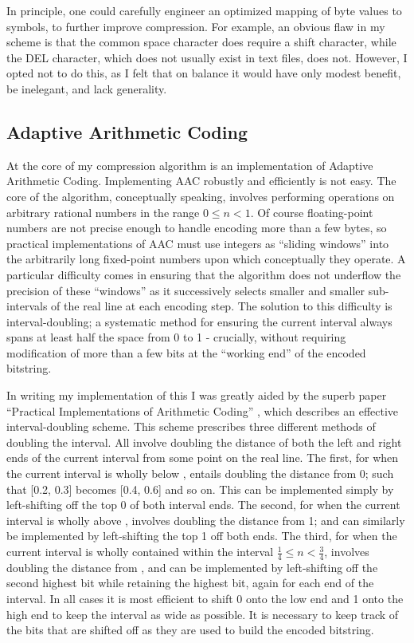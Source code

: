 \documentclass[11pt]{article}
\begin{document}
In principle, one could carefully engineer an optimized mapping of byte values to symbols, to further improve compression. For example, an obvious flaw in my scheme is that the common space character does require a shift character, while the DEL character, which does not usually exist in text files, does not. However, I opted not to do this, as I felt that on balance it would have only modest benefit, be inelegant, and lack generality.


\subsection{Adaptive Arithmetic Coding}

At the core of my compression algorithm is an implementation of Adaptive Arithmetic Coding. Implementing AAC robustly and efficiently is not easy. The core of the algorithm, conceptually speaking, involves performing operations on arbitrary rational numbers in the range $0 \leq n < 1$. Of course floating-point numbers are not precise enough to handle encoding more than a few bytes, so practical implementations of AAC must use integers as \enquote{sliding windows} into the arbitrarily long fixed-point numbers upon which conceptually they operate. A particular difficulty comes in ensuring that the algorithm does not underflow the precision of these \enquote{windows} as it successively selects smaller and smaller sub-intervals of the real line at each encoding step. The solution to this difficulty is interval-doubling; a systematic method for ensuring the current interval always spans at least half the space from 0 to 1 - crucially, without requiring modification of more than a few bits at the \enquote{working end} of the encoded bitstring.

In writing my implementation of this I was greatly aided by the superb paper \enquote{Practical Implementations of Arithmetic Coding} \cite{howard1992practical}, which describes an effective interval-doubling scheme. This scheme prescribes three different methods of doubling the interval. All involve doubling the distance of both the left and right ends of the current interval from some point on the real line. The first, for when the current interval is wholly below , entails doubling the distance from 0; such that [0.2, 0.3] becomes [0.4, 0.6] and so on. This can be implemented simply by left-shifting off the top 0 of both interval ends. The second, for when the current interval is wholly above , involves doubling the distance from 1; and can similarly be implemented by left-shifting the top 1 off both ends. The third, for when the current interval is wholly contained within the interval $\frac{1}{4} \leq n < \frac{3}{4}$, involves doubling the distance from , and can be implemented by left-shifting off the second highest bit while retaining the highest bit, again for each end of the interval. In all cases it is most efficient to shift 0 onto the low end and 1 onto the high end to keep the interval as wide as possible. It is necessary to keep track of the bits that are shifted off as they are used to build the encoded bitstring.
\end{document}
